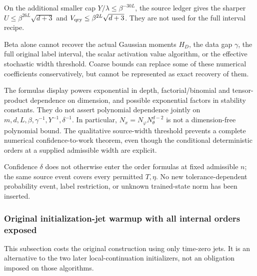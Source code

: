 
On the additional smaller cap \(Y/\lambda\le\beta^{-30L}\), the source ledger gives the sharper \(U\le\beta^{26L}\sqrt{d+3}\) and \(V_{\rm qry}\le\beta^{2L}\sqrt{d+3}\). They are not used for the full interval recipe.



Beta alone cannot recover the actual Gaussian moments \(H_D\), the data gap \(\gamma\), the full original label interval, the scalar activation value algorithm, or the effective stochastic width threshold. Coarse bounds can replace some of these numerical coefficients conservatively, but cannot be represented as exact recovery of them.



The formulas display powers exponential in depth, factorial/binomial and tensor-product dependence on dimension, and possible exponential factors in stability constants. They do not assert polynomial dependence jointly on \(m,\allowbreak d,\allowbreak L,\allowbreak \beta,\allowbreak \gamma^{-1},\allowbreak Y^{-1},\allowbreak \delta^{-1}\). In particular, \(N_x=N_\varphi N_\theta^{d-2}\) is not a dimension-free polynomial bound. The qualitative source-width threshold prevents a complete numerical confidence-to-work theorem, even though the conditional deterministic orders at a supplied admissible width are explicit.



Confidence \(\delta\) does not otherwise enter the order formulas at fixed admissible \(n\); the same source event covers every permitted \(T,\allowbreak \eta\). No new tolerance-dependent probability event, label restriction, or unknown trained-state norm has been inserted.


\subsubsection{Original initialization-jet warmup with all internal orders exposed}
\label{int:harmonic-warmup-cost}


This subsection costs the original construction using only time-zero jets. It is an alternative to the two later local-continuation initializers, not an obligation imposed on those algorithms.



